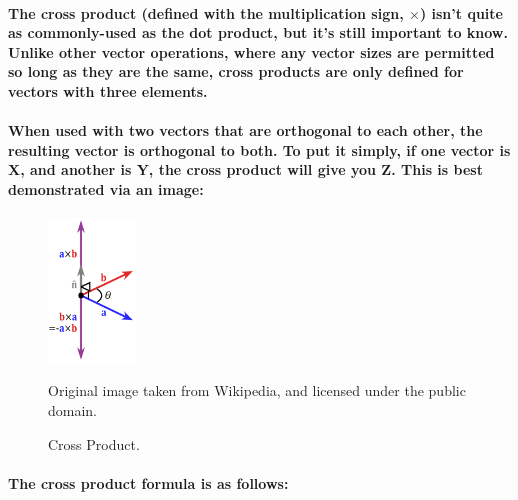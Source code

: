 \paragraph{
    The cross product (defined with the multiplication sign, $\times$) isn't quite as commonly-used as the dot product, but it's still important to know. Unlike other vector operations, where any vector sizes are permitted so long as they are the same, cross products are only defined for vectors with three elements.
}

\begin{sloppypar}
\paragraph{
    When used with two vectors that are orthogonal to each other, the resulting vector is orthogonal to both. To put it simply, if one vector is X, and another is Y, the cross product will give you Z. This is best demonstrated via an image:
}
\end{sloppypar}

\begin{frame}{}
    \begin{figure}[ht]
      \centering
      \includegraphics[width=0.21\textwidth]{images/chap2/CrossProduct.png}
      \caption*{\footnotesize Original image taken from Wikipedia, and licensed under the public domain.}
      \caption{Cross Product.}
      \label{fig:cross_product}
    \end{figure}
\end{frame}
\newpage
\paragraph{
    The cross product formula is as follows:
}

